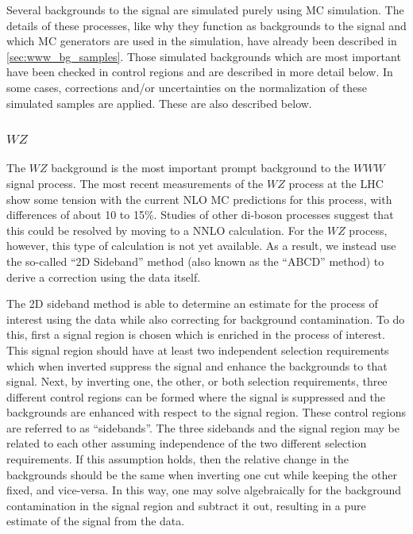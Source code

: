 

Several backgrounds to the signal are simulated purely using MC simulation.
The details of these processes, like why they function as backgrounds
to the signal and which MC generators are used in the simulation,
have already been described in \sec\ref{sec:www_bg_samples}.
Those simulated backgrounds
which are most important have been checked in control regions and are 
described in more detail below.
In some cases, corrections and/or uncertainties on 
the normalization of these simulated samples are applied. 
These are also described below.

%



\subsubsection{$WZ$} 
\label{sec:wzbg}

The $WZ$ background is the most important prompt background 
to the $WWW$ signal process. 
The most recent measurements of the $WZ$ process at the LHC
\cite{Aad:2012twa,Anger:1663539,CMS-PAS-SMP-12-006} 
show some tension with the current NLO MC predictions for this process, 
with differences of about 10 to 15\%. 
Studies of other di-boson processes 
\cite{Grazzini:2015nwa,Cascioli:2014yka}
suggest that this could be resolved by 
moving to a NNLO calculation.
For the $WZ$ process, however, this type of calculation is not yet available.
As a result, we instead use the so-called ``2D Sideband'' method (also known as the 
``ABCD'' method) \cite{Aad:2013izg} to derive a correction using the data itself.


The 2D sideband method is able to determine an estimate
for the process of interest using the data while also correcting
for background contamination. 
To do this, first a signal region 
is chosen which is enriched in the process of interest.
This signal region should have at least two 
independent selection requirements which when inverted suppress
the signal and enhance the backgrounds to that signal.
Next, by inverting one, the other, or both selection requirements, 
three different control regions can be formed
where the signal is suppressed and the backgrounds are enhanced 
with respect to the signal region. 
These control regions are referred to as ``sidebands''.
The three sidebands and the signal region may be
related to each other assuming independence of the two different selection
requirements. If this assumption holds, then the relative change in the 
backgrounds should be the same
when inverting one cut while keeping the other fixed, and vice-versa.
In this way, one may solve algebraically for the background contamination 
in the signal region and subtract it out, resulting in a pure
estimate of the signal from the data. 


